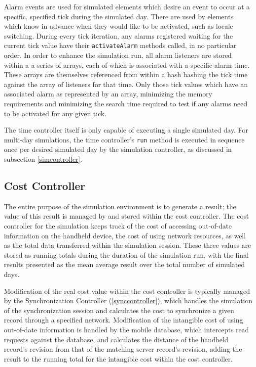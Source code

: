 Alarm events are used for simulated elements which desire an event to occur at a specific, specified tick during the simulated day.  There are used by elements which know in advance when they would like to be activated, such as locale switching.  During every tick iteration, any alarms registered waiting for the current tick value have their \texttt{activateAlarm} methods called, in no particular order.  In order to enhance the simulation run, all alarm listeners are stored within a a series of arrays, each of which is associated with a specific alarm time.  These arrays are themselves referenced from within a hash hashing the tick time against the array of listeners for that time.  Only those tick values which have an associated alarm as represented by an array, minimizing the memory requirements and minimizing the search time required to test if any alarms need to be activated for any given tick.

The time controller itself is only capable of executing a single simulated day.  For multi-day simulations, the time controller's \texttt{run} method is executed in sequence once per desired simulated day by the simulation controller, as discussed in subsection \ref{simcontroller}.

\subsection{Cost Controller}\label{cost_controller}

The entire purpose of the simulation environment is to generate a result; the value of this result is managed by and stored within the cost controller.  The cost controller for the simulation keeps track of the cost of accessing out-of-date information on the handheld device, the cost of using network resources, as well as the total data transferred within the simulation session.  These three values are stored as running totals during the duration of the simulation run, with the final results presented as the mean average result over the total number of simulated days.

Modification of the real cost value within the cost controller is typically managed by the Synchronization Controller (\ref{synccontroller}), which handles the simulation of the synchronization session and calculates the cost to synchronize a given record through a specified network.  Modification of the intangible cost of using out-of-date information is handled by the mobile database, which intercepts read requests against the database, and calculates the distance of the handheld record's revision from that of the matching server record's revision, adding the result to the running total for the intangible cost within the cost controller.

